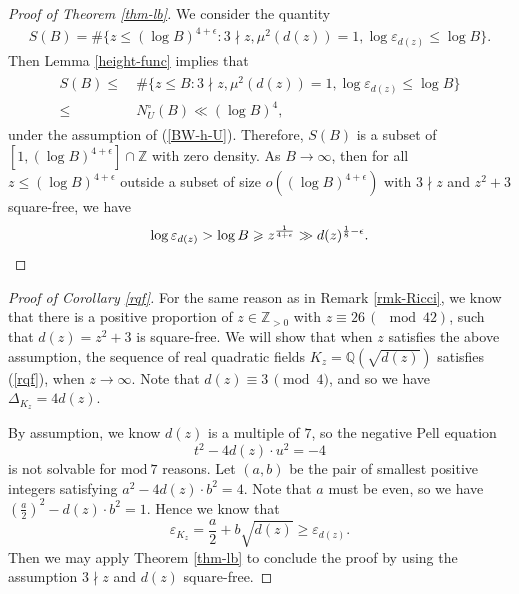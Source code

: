 \documentclass[reqno, 11pt, twoside]{amsart}
\numberwithin{equation}{section}
\theoremstyle{definition}
\renewcommand{\leq}{\leqslant}
\renewcommand{\geq}{\geqslant}
\newcommand{\eps}{\varepsilon}
\newcommand{\QQ}{\mathbb{Q}}
\newcommand{\ZZ}{\mathbb{Z}}
\begin{document}
\begin{proof}[Proof of Theorem \ref{thm-lb}]
	We consider the quantity
	\begin{eqnarray*}
		S(B) = \# \{ z \leq (\log B)^{4 + \epsilon}: 3  \nmid  z, \mu^2(d(z)) = 1, \log \eps_{d(z)} \leq \log B\}.
	\end{eqnarray*}
Then Lemma \ref{height-func} implies that 
\begin{align}\label{sb-lemma}
\begin{split}
		S(B) \leq & \ \# \{ z \leq B: 3  \nmid  z, \mu^2(d(z)) = 1, \log \eps_{d(z)} 
	 \leq \log B\}
	 \\  \leq & \ N_U^{\circ}(B) \ll (\log B)^4,
\end{split}
\end{align}
under the assumption of (\ref{BW-h-U}).
Therefore, $S(B)$ is a subset of $[1, (\log B)^{4 + \epsilon}] \cap \ZZ$ with zero density. As $B \rightarrow \infty$, then for all $z \leq (\log B)^{4 + \epsilon}$ outside a subset of size $o((\log B)^{4 + \epsilon})$ with $3 \nmid z$ and $z^2 + 3$ square-free, we have 
$$\log \eps_{d(z)} > \log B \geq  z^{\frac{1}{4 + \epsilon}} \gg d(z)^{\frac{1}{8} - \epsilon}. \vspace{-0.35em}$$
\end{proof}



\begin{proof}[Proof of Corollary \ref{rqf}]
     For the same reason as in Remark \ref{rmk-Ricci}, we know that there is a positive proportion of $z \in \ZZ_{> 0}$ with $z \equiv 26 \, (\mod 42)$, such that $d(z) = z^2 + 3$ is square-free. We will show that when $z$ satisfies the above assumption, the sequence of real quadratic fields $K_z = \QQ(\sqrt{d(z)})$ satisfies (\ref{rqf}), when $z \rightarrow \infty$. Note that $d(z) \equiv 3 \, \pmod 4$, and so we have $\Delta_{K_z} = 4 d(z)$.

    By assumption, we know $d(z)$ is a multiple of $7$, so the negative Pell equation $$t^2 - 4d(z) \cdot u^2 = -4$$ is not solvable for $\mathrm{mod} \ 7 $ reasons. Let $(a,b)$ be the pair of smallest positive integers satisfying
    $a^2 - 4d(z) \cdot b^2 = 4.$ Note that $a$ must be even, so we have
    $(\frac{a}{2})^2 - d(z) \cdot b^2 = 1.$
    Hence we know that
    $$\eps_{K_z} = \frac{a}{2} + b \sqrt{d(z)} \geq \eps_{d(z)}.$$
    Then we may apply Theorem \ref{thm-lb} to conclude the proof by using the assumption $3 \nmid z$ and $d(z)$ square-free.
\end{proof}
\end{document}
